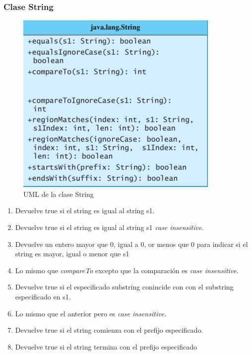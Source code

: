 \documentclass{beamer}
\begin{document}
\begin{frame}
\frametitle{Clase String} 
\begin{multicols}{2}
\begin{figure}
\includegraphics[scale=0.55]{imagenes/string.png} 
\caption{UML de la clase String}
\end{figure} 
\begin{scriptsize}
\begin{enumerate}[<+-| alert@+>]
      \item Devuelve true si el  string es igual al string s1.
      \item Devuelve true si el string es igual al string s1 \emph{case
insensitive}.
      \item Devuelve un entero mayor que 0, igual a 0, or menos que 0 para indicar si el string es mayor, igual o menor que s1
     \item Lo mismo que \emph{compareTo} excepto que la comparación es \emph{case insensitive.}
      \item Devuelve true si el especificado substring conincide con con el substring especificado en s1.
      \item Lo mismo que el anterior pero es \emph{case insensitive.}
      \item Devuelve true si el string comienza con el prefijo especificado.
      \item Devuelve true si el string termina con el prefijo especificado
      \end{enumerate}
\end{scriptsize}
\end{multicols}
\pause
\end{frame}
\end{document}
